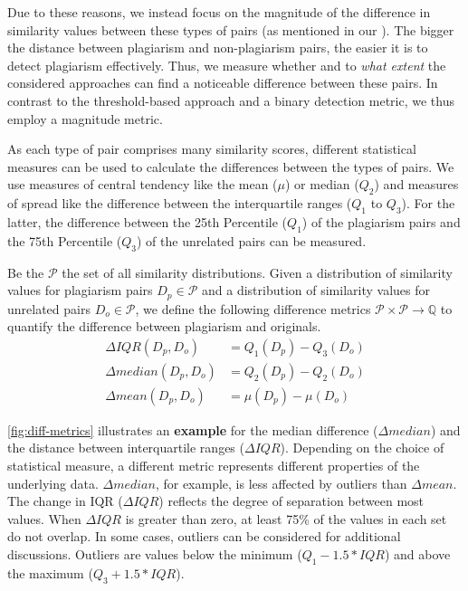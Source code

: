 Due to these reasons, we instead focus on the magnitude of the difference in similarity values between these types of pairs (as mentioned in our \gqm). The bigger the distance between plagiarism and non-plagiarism pairs, the easier it is to detect plagiarism effectively.
Thus, we measure whether and to \textit{what extent} the considered approaches can find a noticeable difference between these pairs. In contrast to the threshold-based approach and a binary detection metric, we thus employ a magnitude metric.

As each type of pair comprises many similarity scores, different statistical measures can be used to calculate the differences between the types of pairs.
We use measures of central tendency like the mean ($\mu$) or median ($Q_2$) and measures of spread like the difference between the interquartile ranges ($Q_1$ to $Q_3$). For the latter, the difference between the 25th Percentile ($Q_1$) of the plagiarism pairs and the 75th Percentile ($Q_3$) of the unrelated pairs can be measured.

\begin{samepage}
\begin{theorem}\label{def:delta-metrics}
Be the \(\mathcal{P}\) the set of all similarity distributions.
Given a distribution of similarity values for plagiarism pairs \(D_p \in \mathcal{P} \) and a distribution of similarity values for unrelated pairs \(D_o \in \mathcal{P}\), we define the following difference metrics \(\mathcal{P} \times \mathcal{P} \rightarrow  \mathbb{Q} \)  to quantify the difference between plagiarism and originals.
%
\begin{align*}
    \Delta IQR(D_p, D_o) &= Q_1(D_p) - Q_3(D_o) \\
%
    \Delta median(D_p, D_o) &= Q_2(D_p) - Q_2(D_o) \\
%
    \Delta mean(D_p, D_o) &= \mu(D_p) - \mu(D_o) 
\end{align*}
\end{theorem}
\end{samepage}

\autoref{fig:diff-metrics} illustrates an \textbf{example} for the median difference ($\Delta median$) and the distance between interquartile ranges ($\Delta IQR$).
Depending on the choice of statistical measure, a different metric represents different properties of the underlying data. $\Delta median$, for example, is less affected by outliers than $\Delta mean$. The change in IQR ($\Delta IQR$) reflects the degree of separation between most values. When $\Delta IQR$ is greater than zero, at least 75\% of the values in each set do not overlap.
In some cases, outliers can be considered for additional discussions. Outliers are values below the minimum ($Q_1 - 1.5 * IQR$) and above the maximum ($Q_3 + 1.5 * IQR$).

